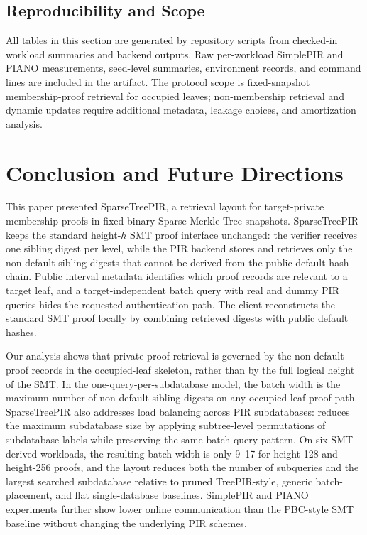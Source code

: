 \subsection{Reproducibility and Scope}

All tables in this section are generated by repository scripts from checked-in workload summaries and backend outputs. Raw per-workload SimplePIR and PIANO measurements, seed-level summaries, environment records, and command lines are included in the artifact. The protocol scope is fixed-snapshot membership-proof retrieval for occupied leaves; non-membership retrieval and dynamic updates require additional metadata, leakage choices, and amortization analysis.

\section{Conclusion and Future Directions}
\label{sec:conclusion}

This paper presented SparseTreePIR, a retrieval layout for target-private membership proofs in fixed binary Sparse Merkle Tree snapshots. SparseTreePIR keeps the standard height-$h$ SMT proof interface unchanged: the verifier receives one sibling digest per level, while the PIR backend stores and retrieves only the non-default sibling digests that cannot be derived from the public default-hash chain. Public interval metadata identifies which proof records are relevant to a target leaf, and a target-independent batch query with real and dummy PIR queries hides the requested authentication path. The client reconstructs the standard SMT proof locally by combining retrieved digests with public default hashes.

Our analysis shows that private proof retrieval is governed by the non-default proof records in the occupied-leaf skeleton, rather than by the full logical height of the SMT. In the one-query-per-subdatabase model, the batch width is the maximum number of non-default sibling digests on any occupied-leaf proof path. SparseTreePIR also addresses load balancing across PIR subdatabases: \ActiveBalance{} reduces the maximum subdatabase size by applying subtree-level permutations of subdatabase labels while preserving the same batch query pattern. On six SMT-derived workloads, the resulting batch width is only 9--17 for height-128 and height-256 proofs, and the layout reduces both the number of subqueries and the largest searched subdatabase relative to pruned TreePIR-style, generic batch-placement, and flat single-database baselines. SimplePIR and PIANO experiments further show lower online communication than the PBC-style SMT baseline without changing the underlying PIR schemes.

